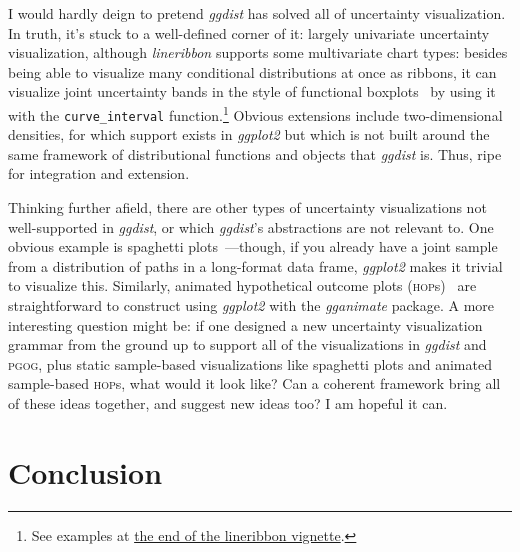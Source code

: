 \documentclass[journal]{vgtc}                     %
\begin{document}
I would hardly deign to pretend \textit{ggdist} has solved all of uncertainty visualization. In truth, it's stuck to a well-defined corner of it: largely univariate uncertainty visualization, although \textit{lineribbon} supports some multivariate chart types: besides being able to visualize many conditional distributions at once as ribbons, it can visualize joint uncertainty bands in the style of functional boxplots~\cite{sun2011functional,mirzargar2014curve,juul2021fixed} by using it with the \texttt{curve\_interval} function.\footnote{See examples at \href{https://mjskay.github.io/ggdist/articles/lineribbon.html\#curve-boxplots-aka-lineribbons-with-joint-intervals-or-curvewise-intervals}{the end of the lineribbon vignette}.} Obvious extensions include two-dimensional densities, for which support exists in \textit{ggplot2} but which is not built around the same framework of distributional functions and objects that \textit{ggdist} is. Thus, ripe for integration and extension.

Thinking further afield, there are other types of uncertainty visualizations not well-supported in \textit{ggdist}, or which \textit{ggdist}'s abstractions are not relevant to. One obvious example is spaghetti plots~\cite{cox2013visualizing,liu2018visualizing}---though, if you already have a joint sample from a distribution of paths in a long-format data frame, \textit{ggplot2} makes it trivial to visualize this. Similarly, animated hypothetical outcome plots (\textsc{hop}s)~\cite{hullman2015hypothetical,kale2018hypothetical} are straightforward to construct using \textit{ggplot2} with the \textit{gganimate} package. A more interesting question might be: if one designed a new uncertainty visualization grammar from the ground up to support all of the  visualizations in \textit{ggdist} and \textsc{pgog}, plus static sample-based visualizations like spaghetti plots and animated sample-based \textsc{hop}s, what would it look like? Can a coherent framework bring all of these ideas together, and suggest new ideas too? I am hopeful it can.

\section{Conclusion}
\end{document}
